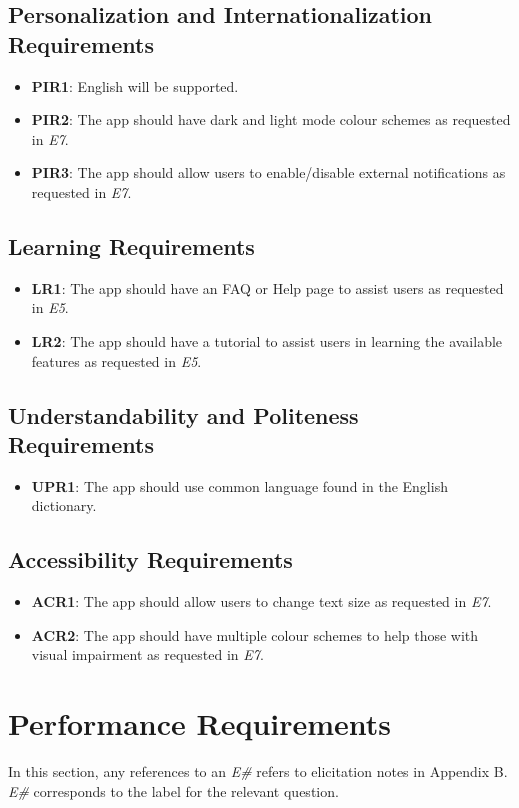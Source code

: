 \documentclass[12pt]{article}
\begin{document}
\subsection{Personalization and Internationalization Requirements}
\begin{itemize}
  \item \textbf{PIR1}: English will be supported.
  \item \textbf{PIR2}: The app should have dark and light mode colour schemes as requested in \textit{E7}.
  \item \textbf{PIR3}: The app should allow users to enable/disable external notifications as requested in \textit{E7}.
\end{itemize}
\subsection{Learning Requirements}
\begin{itemize}
  \item \textbf{LR1}: The app should have an FAQ or Help page to assist users as requested in \textit{E5}.
  \item \textbf{LR2}: The app should have a tutorial to assist users in learning the available
  features as requested in \textit{E5}.
\end{itemize}
\subsection{Understandability and Politeness Requirements}
\begin{itemize}
  \item \textbf{UPR1}: The app should use common language found in the English dictionary.
\end{itemize}
\subsection{Accessibility Requirements}
\begin{itemize}
  \item \textbf{ACR1}: The app should allow users to change text size as requested in \textit{E7}.
  \item \textbf{ACR2}: The app should have multiple colour schemes to help those with visual impairment
  as requested in \textit{E7}.
\end{itemize}

\section{Performance Requirements}
In this section, any references to an \textit{E\#} refers to elicitation notes in Appendix B. \textit{E\#} corresponds
to the label for the relevant question.
\end{document}

